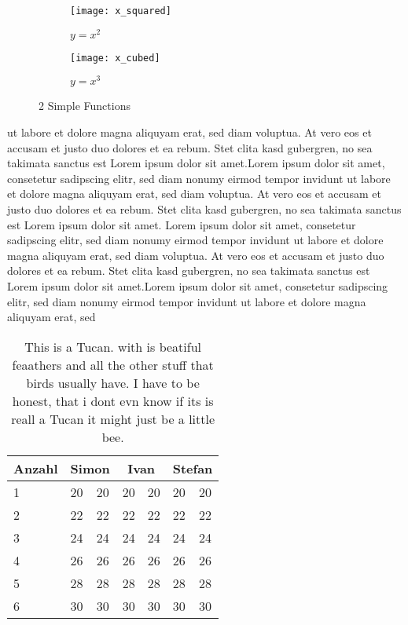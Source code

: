 \begin{figure}
	\centering
	\begin{subfigure}[b]{0.45\textwidth}
		\centering
		\texttt{[image: x\_squared]}
		\caption{$y = x^2$}
		\label{fig: x_squared}
	\end{subfigure}
	\hfill
	\begin{subfigure}[b]{0.45\textwidth}
		\centering
		\texttt{[image: x\_cubed]}
		\caption{$y = x^3$}
		\label{fig: x_cubed}
	\end{subfigure}
	\caption{2 Simple Functions}
	\label{fig: 2 func}
\end{figure}


ut labore et dolore magna aliquyam erat, sed diam voluptua. At vero eos et accusam et justo duo dolores et ea rebum. Stet clita kasd gubergren, no sea takimata sanctus est Lorem ipsum dolor sit amet.Lorem ipsum dolor sit amet, consetetur sadipscing elitr, sed diam nonumy eirmod tempor invidunt ut labore et dolore magna aliquyam erat, sed diam voluptua. At vero eos et accusam et justo duo dolores et ea rebum. Stet clita kasd gubergren, no sea takimata sanctus est Lorem ipsum dolor sit amet. Lorem ipsum dolor sit amet, consetetur sadipscing elitr, sed diam nonumy eirmod tempor invidunt ut labore et dolore magna aliquyam erat, sed diam voluptua. At vero eos et accusam et justo duo dolores et ea rebum. Stet clita kasd gubergren, no sea takimata sanctus est Lorem ipsum dolor sit amet.Lorem ipsum dolor sit amet, consetetur sadipscing elitr, sed diam nonumy eirmod tempor invidunt ut labore et dolore magna aliquyam erat, sed 


\begin{table}
\caption{This is a Tucan. with is beatiful feaathers and all the other stuff that birds usually have. I have to be honest, that i dont evn know if its is reall a Tucan it might just be a little bee.}
\centering
\begin{tabular}{@{}lllllll@{}}
\toprule
Anzahl                  & \multicolumn{2}{c}{Simon}    & \multicolumn{2}{c}{Ivan}     & \multicolumn{2}{c}{Stefan}   \\ \midrule
\multicolumn{1}{|l|}{1} & 20 & \multicolumn{1}{l|}{20} & 20 & \multicolumn{1}{l|}{20} & 20 & \multicolumn{1}{l|}{20} \\
\multicolumn{1}{|l|}{2} & 22 & \multicolumn{1}{l|}{22} & 22 & \multicolumn{1}{l|}{22} & 22 & \multicolumn{1}{l|}{22} \\
\multicolumn{1}{|l|}{3} & 24 & \multicolumn{1}{l|}{24} & 24 & \multicolumn{1}{l|}{24} & 24 & \multicolumn{1}{l|}{24} \\
\multicolumn{1}{|l|}{4} & 26 & \multicolumn{1}{l|}{26} & 26 & \multicolumn{1}{l|}{26} & 26 & \multicolumn{1}{l|}{26} \\
\multicolumn{1}{|l|}{5} & 28 & \multicolumn{1}{l|}{28} & 28 & \multicolumn{1}{l|}{28} & 28 & \multicolumn{1}{l|}{28} \\
\multicolumn{1}{|l|}{6} & 30 & \multicolumn{1}{l|}{30} & 30 & \multicolumn{1}{l|}{30} & 30 & \multicolumn{1}{l|}{30} \\ \bottomrule
\end{tabular}
\end{table}


